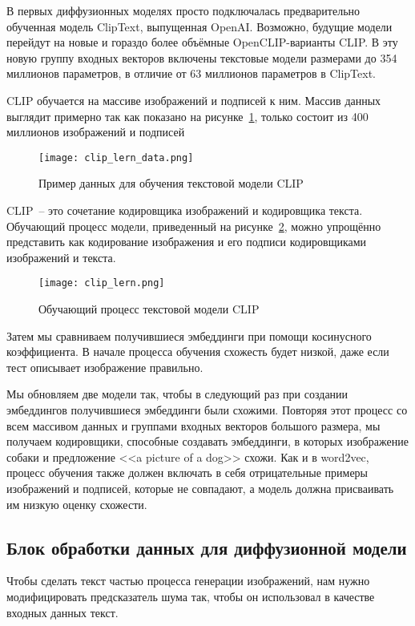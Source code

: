 В первых диффузионных моделях просто подключалась предварительно обученная модель ClipText, выпущенная OpenAI. Возможно, будущие модели перейдут на новые и гораздо более объёмные OpenCLIP-варианты CLIP. В эту новую группу входных векторов включены текстовые модели размерами до 354 миллионов параметров, в отличие от 63 миллионов параметров в ClipText.

CLIP обучается на массиве изображений и подписей к ним. Массив данных выглядит примерно так как показано на рисунке~\ref{func::clip_lern_data}, только состоит из 400 миллионов изображений и подписей

\begin{figure}[ht]
    \centering
    \texttt{[image: clip\_lern\_data.png]}
    \caption{Пример данных для обучения текстовой модели CLIP}
    \label{func::clip_lern_data}
\end{figure}

CLIP~-- это сочетание кодировщика изображений и кодировщика текста. Обучающий процесс модели, приведенный на рисунке~\ref{func::clip_lern}, можно упрощённо представить как кодирование изображения и его подписи кодировщиками изображений и текста.

\begin{figure}[ht]
    \centering
    \texttt{[image: clip\_lern.png]}
    \caption{Обучающий процесс текстовой модели CLIP}
    \label{func::clip_lern}
\end{figure}

Затем мы сравниваем получившиеся эмбеддинги при помощи косинусного коэффициента. В начале процесса обучения схожесть будет низкой, даже если тест описывает изображение правильно.

Мы обновляем две модели так, чтобы в следующий раз при создании эмбеддингов получившиеся эмбеддинги были схожими. Повторяя этот процесс со всем массивом данных и группами входных векторов большого размера, мы получаем кодировщики, способные создавать эмбеддинги, в которых изображение собаки и предложение <<a picture of a dog>> схожи. Как и в word2vec, процесс обучения также должен включать в себя отрицательные примеры изображений и подписей, которые не совпадают, а модель должна присваивать им низкую оценку схожести.

\subsection{Блок обработки данных для диффузионной модели}

Чтобы сделать текст частью процесса генерации изображений, нам нужно модифицировать предсказатель шума так, чтобы он использовал в качестве входных данных текст.

